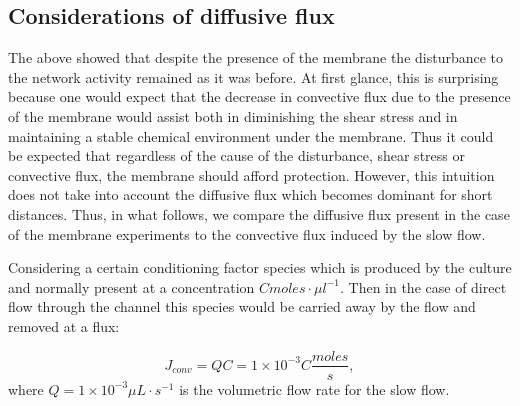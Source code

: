         \subsection{Considerations of diffusive flux}
        The above showed that despite the presence of the membrane the disturbance to the network activity remained as it was before. At first glance, this is surprising because one would expect that the decrease in convective flux due to the presence of the membrane would assist both in diminishing the shear stress and in maintaining a stable chemical environment under the membrane. Thus it could be expected that regardless of the cause of the disturbance, shear stress or convective flux, the membrane should afford protection. However, this intuition does not take into account the diffusive flux which becomes dominant for short distances. Thus, in what follows, we compare the diffusive flux present in the case of the membrane experiments to the convective flux induced by the slow flow.

        Considering a certain conditioning factor species which is produced by the culture and normally present at a concentration \(C moles\cdot \mu l^{-1}\). Then in the case of direct flow through the channel this species would be carried away by the flow and removed at a flux:

        \[J_{conv}=QC=1\times 10^{-3}C \frac{moles}{s},\] where \(Q=1\times 10^{-3} \mu L\cdot s^{-1}\) is the volumetric flow rate for the slow flow.

